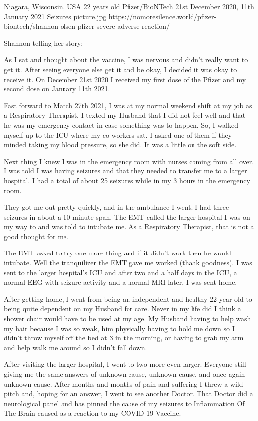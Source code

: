 {Niagara, Wisconsin, USA}
{22 years old}
{Pfizer/BioNTech}
{21st December 2020, 11th January 2021}
{Seizures}
{picture.jpg}
{https://nomoresilence.world/pfizer-biontech/shannon-olsen-pfizer-severe-adverse-reaction/}
{

\normalsize

Shannon telling her story:

As I sat and thought about the vaccine, I was nervous and didn’t really want to
get it. After seeing everyone else get it and be okay, I decided it was okay to
receive it. On December 21st 2020 I received my first dose of the Pfizer and my
second dose on January 11th 2021.

Fast forward to March 27th 2021, I was at my normal weekend shift at my job as a
Respiratory Therapist, I texted my Husband that I did not feel well and that he
was my emergency contact in case something was to happen. So, I walked myself up
to the ICU where my co-workers sat. I asked one of them if they minded taking my
blood pressure, so she did. It was a little on the soft side.

Next thing I knew I was in the emergency room with nurses coming from all
over. I was told I was having seizures and that they needed to transfer me to a
larger hospital. I had a total of about 25 seizures while in my 3 hours in the
emergency room.

They got me out pretty quickly, and in the ambulance I went. I had three
seizures in about a 10 minute span. The EMT called the larger hospital I was on
my way to and was told to intubate me. As a Respiratory Therapist, that is not a
good thought for me.

The EMT asked to try one more thing and if it didn’t work then he would
intubate. Well the tranquilizer the EMT gave me worked (thank goodness). I was
sent to the larger hospital’s ICU and after two and a half days in the ICU, a
normal EEG with seizure activity and a normal MRI later, I was sent home.

After getting home, I went from being an independent and healthy 22-year-old to
being quite dependent on my Husband for care. Never in my life did I think a
shower chair would have to be used at my age. My Husband having to help wash my
hair because I was so weak, him physically having to hold me down so I didn’t
throw myself off the bed at 3 in the morning, or having to grab my arm and help
walk me around so I didn’t fall down.

After visiting the larger hospital, I went to two more even larger. Everyone
still giving me the same answers of unknown cause, unknown cause, and once again
unknown cause. After months and months of pain and suffering I threw a wild
pitch and, hoping for an answer, I went to see another Doctor. That Doctor did a
neurological panel and has pinned the cause of my seizures to Inflammation Of
The Brain caused as a reaction to my COVID-19 Vaccine.

}
